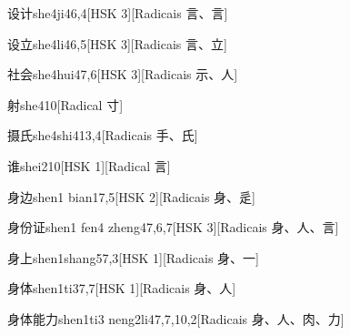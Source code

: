 \begin{entry}{设计}{she4ji4}{6,4}[HSK 3][Radicais ⾔、⾔]
\end{entry}

\begin{entry}{设立}{she4li4}{6,5}[HSK 3][Radicais ⾔、⽴]
\end{entry}

\begin{entry}{社会}{she4hui4}{7,6}[HSK 3][Radicais ⽰、⼈]
\end{entry}

\begin{entry}{射}{she4}{10}[Radical ⼨]
\end{entry}

\begin{entry}{摄氏}{she4shi4}{13,4}[Radicais ⼿、⽒]
\end{entry}

\begin{entry}{谁}{shei2}{10}[HSK 1][Radical ⾔]
\end{entry}

\begin{entry}{身边}{shen1 bian1}{7,5}[HSK 2][Radicais ⾝、⾡]
\end{entry}

\begin{entry}{身份证}{shen1 fen4 zheng4}{7,6,7}[HSK 3][Radicais ⾝、⼈、⾔]
\end{entry}

\begin{entry}{身上}{shen1shang5}{7,3}[HSK 1][Radicais ⾝、⼀]
\end{entry}

\begin{entry}{身体}{shen1ti3}{7,7}[HSK 1][Radicais ⾝、⼈]
\end{entry}

\begin{entry}{身体能力}{shen1ti3 neng2li4}{7,7,10,2}[Radicais ⾝、⼈、⾁、⼒]
\end{entry}

